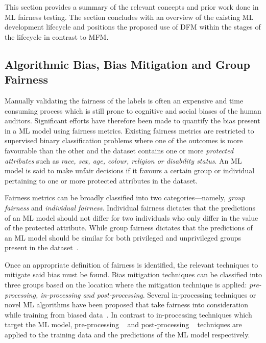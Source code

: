 \documentclass[conference]{IEEEtran}
\begin{document}
This section provides a summary of the relevant concepts and prior
work done in ML fairness testing. The section concludes with an
overview of the existing ML development lifecycle and positions the
proposed use of DFM within the stages of the lifecycle in contrast to
MFM.

\subsection{Algorithmic Bias, Bias Mitigation and Group Fairness}\label{sec:bias-fairness}

Manually validating the fairness of the labels is often an expensive
and time consuming process which is still prone to cognitive and
social biases of the human auditors. Significant efforts have
therefore been made to quantify the bias present in a ML model using
fairness metrics. Existing fairness metrics are restricted to
supervised binary classification problems where one of the outcomes is
more favourable than the other and the dataset contains one or more
\emph{protected attributes} such as \emph{race, sex, age, colour,
religion or disability status}. An ML model is said to make unfair
decisions if it favours a certain group or individual pertaining to
one or more protected attributes in the dataset.

Fairness metrics can be broadly classified into two
categories---namely, \emph{group fairness} and \emph{individual
fairness}. Individual fairness dictates that the predictions of an ML
model should not differ for two individuals who only differ in the
value of the protected attribute. While group fairness dictates that
the predictions of an ML model should be similar for both privileged
and unprivileged groups present in the
dataset \cite{castelnovo2022clarification,hellman2020measuring,mitchell2021algorithmic,kusner2017counterfactual,grgic2016case,dwork2012fairness,barocas2019fairness,barocas2016big,hardt2016equality,binns2018fairness,verma2018fairness,saxena2019fairness}.

Once an appropriate definition of fairness is identified, the relevant
techniques to mitigate said bias must be found. Bias mitigation
techniques can be classified into three groups based on the location
where the mitigation technique is applied: \emph{pre-processing,
in-processing and post-processing}. Several in-processing techniques
or novel ML algorithms have been proposed that take fairness into
consideration while training from biased
data \cite{zhang2018mitigating,agarwal2018reductions,kearns2018preventing,kamishima2012fairness}.
In contrast to in-processing techniques which target the ML model,
pre-processing
 \cite{feldman2015certifying,zemel2013learning,calmon2017optimized,kamiran2012data}
and post-processing
 \cite{pleiss2017fairness,hardt2016equality,kamiran2012decision}
techniques are applied to the training data and the predictions of the
ML model respectively.
\end{document}
